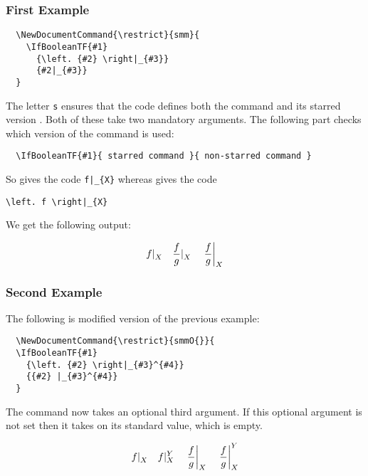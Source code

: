 \documentclass[a4paper, 10pt, abstract=on, headings=standardclasses]{scrartcl}
\begin{document}
\subsubsection{First Example}

\begin{lstlisting}
  \NewDocumentCommand{\restrict}{smm}{
    \IfBooleanTF{#1}
      {\left. {#2} \right|_{#3}}
      {#2|_{#3}}
  }
\end{lstlisting}
The letter \texttt{s} ensures that the code defines both the command  and its starred version .
Both of these take two mandatory arguments.
The following part checks which version of the command is used:
\begin{lstlisting}
  \IfBooleanTF{#1}{ starred command }{ non-starred command }
\end{lstlisting}
So  gives the code \texttt{f|\_\{X\}} whereas  gives the code
\begin{center}
  \texttt{{\textbackslash}left. f {\textbackslash}right|\_\{X\}}
\end{center}
We get the following output:
\begin{LTXexample}[pos = r]
  \[
    \restrict{f}{X}
    \quad
    \restrict{\frac{f}{g}}{X}
    \quad
    \restrict*{\frac{f}{g}}{X}
  \]
\end{LTXexample}

\subsubsection{Second Example}

The following is modified version of the previous example:
\begin{lstlisting}
  \NewDocumentCommand{\restrict}{smmO{}}{
  \IfBooleanTF{#1}
    {\left. {#2} \right|_{#3}^{#4}}
    {{#2} |_{#3}^{#4}}
  }
\end{lstlisting}
The command now takes an optional third argument.
If this optional argument is not set then it takes on its standard value, which is empty.
\begin{LTXexample}[pos = r]
  \[
    \restrict{f}{X}
    \quad
    \restrict{f}{X}[Y]
    \quad
    \restrict*{\frac{f}{g}}{X}
    \quad
    \restrict*{\frac{f}{g}}{X}[Y]
  \]
\end{LTXexample}
\end{document}
